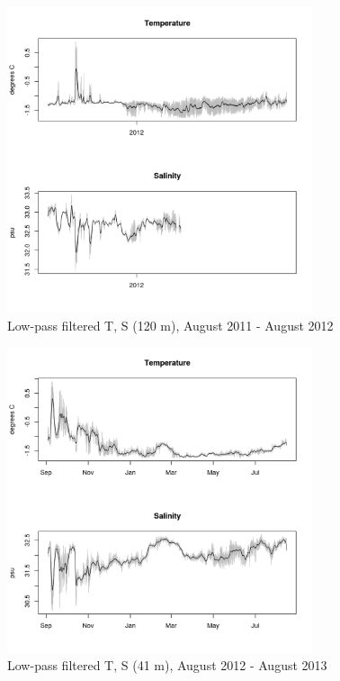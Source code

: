 \documentclass[12pt]{dforeport}
\begin{document}
\begin{figure}  
\centering
\includegraphics[width = 0.8\textwidth]{./figures/21_lpf_TS_120m_2011_2012.png}
\caption[Low-pass filtered T, S (120 m), 2011-2012]{Low-pass filtered T, S (120 m), August 2011 - August 2012}
\label{f:ctd_120_lpf_2011_2012}
\end{figure}


\begin{figure}  
\centering
\includegraphics[width = 0.8\textwidth]{./figures/22_lpf_TS_41m_2012_2013.png}
\caption[Low-pass filtered T, S (41 m), 2012-2013]{Low-pass filtered T, S (41 m), August 2012 - August 2013}
\label{f:ctd_41_lpf_2012_2013}
\end{figure}
\end{document}
